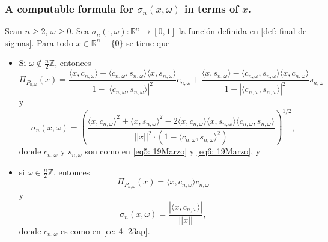 \documentclass[]{beamer}
\theoremstyle{definition}
\newcommand{\IR}{\mathbb{R}}
\newcommand{\IZ}{\mathbb{Z}}
\begin{document}
\begin{frame}
\frametitle{A computable formula for $\sigma_{n}(x, \omega)$ in terms of $x$.}
Sean $n \geq 2$, $\omega \geq 0$. 
Sea $\sigma_{n}(\cdot,\omega): \IR^{n} \longrightarrow [0,1]$
la función definida en \ref{def: final de sigmas}.
Para todo $x \in \IR^{n}-\{ 0 \}$
se tiene que
\begin{itemize}
	\item Si $\omega \not\in \frac{n}{2} \IZ$, entonces
	\begin{equation}
	\label{eq: pi ommm 1}
	 \Pi_{P_{n, \omega}}(x) = 
\frac{
\langle x, c_{n, \omega} \rangle - \langle c_{n, \omega}, s_{n, \omega} \rangle 
\langle x, s_{n, \omega} \rangle
}
{1-|\langle c_{n, \omega}, s_{n, \omega} \rangle |^{2}  }
c_{n, \omega} +
\frac{
\langle x, s_{n, \omega} \rangle - \langle c_{n, \omega}, s_{n, \omega} \rangle 
\langle x, c_{n, \omega} \rangle
}
{1-|\langle c_{n, \omega}, s_{n, \omega} \rangle |^{2}  }
s_{n, \omega}
	\end{equation}
	y 
	\begin{equation}
	\label{eq: coef sigma caso 1}
	\sigma_{n}(x, \omega) =
	\left(		  
		  \frac{\langle x, c_{n, \omega } \rangle^{2} +  \langle x, s_{n, \omega } \rangle^{2}	
	       -2  \langle x, c_{n, \omega } \rangle \langle x, s_{n, \omega } \rangle \langle c_{n, \omega }, s_{n, \omega } \rangle}{ || x ||^{2} \cdot
	       (1- \langle c_{n, \omega }, s_{n, \omega } \rangle^{2})}	  
\right) ^{1/2},
	\end{equation}
donde $c_{n, \omega}$ y $s_{n, \omega}$ son como en 
\eqref{eq5: 19Marzo} y \eqref{eq6: 19Marzo},  y
\end{itemize}
\end{frame}

\begin{frame}
\begin{itemize}
\item si $\omega \in \frac{n}{2} \IZ$, entonces 
\begin{equation}
\label{eq: pi ommm 2}
\Pi_{P_{n, \omega}}(x) = \langle x, c_{n, \omega} \rangle c_{n, \omega}
\end{equation}
y 
\begin{equation}
\label{eq: sfklmslsfl}
\sigma_{n}(x, \omega) = \frac{|\langle x, c_{n, \omega} \rangle |}{||x||},
\end{equation}
donde $c_{n, \omega}$ es como en \eqref{ec: 4: 23ap}.
\end{itemize}
\end{frame}
\end{document}
